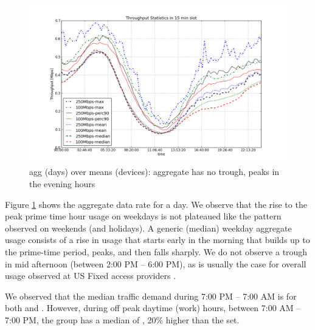 \begin{figure}[ht]
\begin{minipage}{\linewidth}
  \centering
  \includegraphics[width=\linewidth]{figures/describe-total-throughput-per-day[replace].png}
  \caption{agg (days) over means (devices): aggregate has no trough, peaks in the evening hours}
  \label{fig:TS-data-rate-daily}
\end{minipage}
\end{figure}



Figure \ref{fig:TS-data-rate-daily} shows the aggregate data rate for a day. We observe that the rise to the peak prime time hour usage on weekdays is not plateaued like the pattern observed on weekends (and holidays).
A generic (median) weekday aggregate usage consists of a rise in usage that starts
early in the morning that builds up to the prime-time period, peaks, and then falls sharply.
We do not observe a trough in mid afternoon (between 2:00 PM -- 6:00 PM), as is usually
the case for overall usage observed at US Fixed access providers \cite{sandvine20141h}.

We observed that the median traffic demand during 7:00 PM -- 7:00 AM is  for
both \treatment{} and \control{}. However, during off peak daytime (work) hours, between
7:00 AM -- 7:00 PM, the \treatment{} group has a median of , 20\% higher than
the \control{} set.


